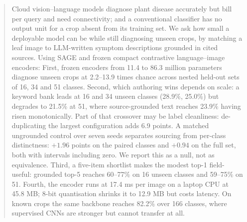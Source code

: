 \documentclass[a4paper,fleqn]{cas-dc}
\begin{document}

\begin{abstract}
Cloud vision--language models diagnose plant disease accurately but bill per query and need
connectivity; and a conventional classifier has no output unit for a crop absent from its training set. We ask how small
a deployable model can be while still diagnosing unseen crops, by matching a leaf image to
LLM-written symptom descriptions grounded in cited sources. Using SAGE and frozen compact contrastive language--image encoders: First, frozen encoders from 11.4 to 86.3 million parameters diagnose unseen
crops at 2.2--13.9 times chance across nested held-out sets of 16, 34 and 51 classes. Second, which authoring wins depends on scale: a keyword bank leads
at 16 and 34 unseen classes (28.9\%, 25.0\%) but degrades to 21.5\% at 51, where
source-grounded text reaches 23.9\% having risen monotonically. Part of that crossover may
be label cleanliness: de-duplicating the largest configuration adds 6.9 points. A matched ungrounded control over seven seeds separates
sourcing from per-class distinctness: $+1.96$ points on the paired classes and $+0.94$ on
the full set, both with intervals including zero. We report this as a null, not as
equivalence. Third, a five-item shortlist makes the modest top-1 field-useful:
grounded top-5 reaches 60--77\% on 16 unseen classes and 59--75\% on 51. Fourth, the encoder runs at 17.4 ms per image on a laptop CPU at 45.8 MB;
8-bit quantisation shrinks it to 12.9 MB but costs latency. On known crops the same backbone reaches 82.2\% over 166 classes,
where supervised CNNs are stronger but cannot transfer at all.
\end{abstract}
\end{document}

